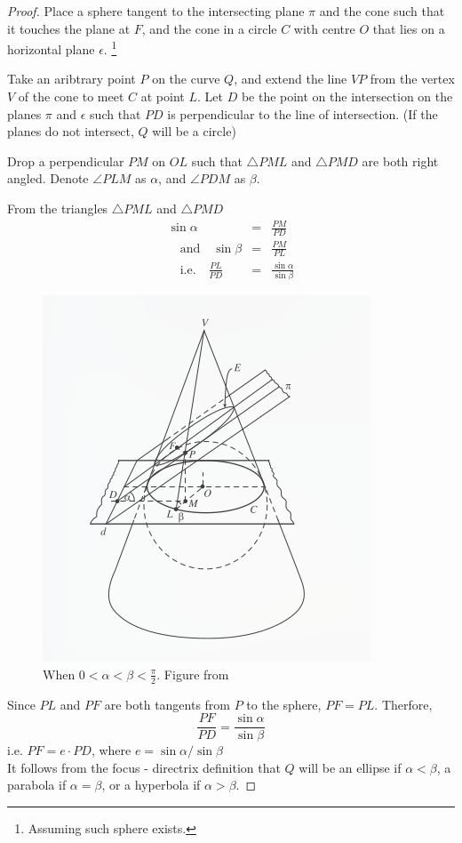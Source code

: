 \begin{proof}
  Place a sphere tangent to the intersecting plane $\pi$ and the cone such that it touches the
  plane at $F$, and the cone in a circle $C$ with centre $O$ that lies on a horizontal plane
  $\epsilon$. \footnote{Assuming such sphere exists.}

  Take an aribtrary point $P$ on the curve $Q$, and extend the line $VP$ from the vertex $V$
  of the cone to meet $C$ at point $L$. Let $D$ be the point on the intersection on the planes
  $\pi$ and $\epsilon$ such that $PD$ is perpendicular to the line of intersection. (If the
  planes do not intersect, $Q$ will be a circle)

  Drop a perpendicular $PM$ on $OL$ such that $\triangle PML$ and $\triangle PMD$ are both
  right angled. Denote $\angle PLM$ as $\alpha$, and $\angle PDM$ as $\beta$.

  From the triangles  $\triangle PML$ and $\triangle PMD$
  \begin{eqnarray*}
    \sin{\alpha}&=&\frac{PM}{PD}\\ 
    \quad \textrm{and} \quad \sin{\beta}&=&\frac{PM}{PL}\\
    \quad \textrm{i.e.} \quad \frac{PL}{PD}&=&\frac{\sin{\alpha}}{\sin{\beta}}
  \end{eqnarray*}

  \begin{figure}[h]
    \center
    \includegraphics[width=0.85\linewidth]{dandelin.png}
    \caption{When $0<\alpha<\beta<\frac{\pi}{2}$. Figure from \cite{brannan}}
  \end{figure}

  Since $PL$ and $PF$ are both tangents from $P$ to the sphere, $PF=PL$. Therfore,
  \[\frac{PF}{PD}=\frac{\sin{\alpha}}{\sin{\beta}}\]
  i.e. $PF=e\cdot PD$, where $e=\sin{\alpha}/\sin{\beta}$\\
  It follows from the focus - directrix definition that $Q$ will be an ellipse if
  $\alpha<\beta$, a parabola if $\alpha=\beta$, or a hyperbola if $\alpha>\beta$.
\end{proof}

